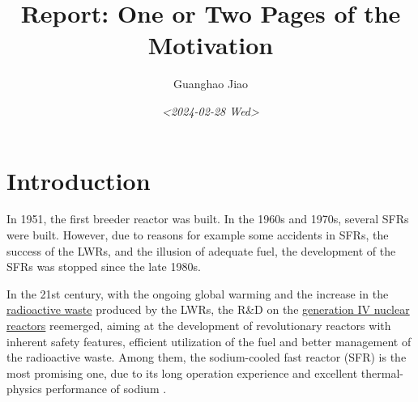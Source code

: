 \documentclass[11pt]{article}
\author{Guanghao Jiao}
\date{\textit{<2024-02-28 Wed>}}
\title{Report: One or Two Pages of the Motivation}
\begin{document}
\maketitle


\section{Introduction}
\label{sec:orge25106c}
In 1951, the first breeder reactor was built. In the 1960s and 1970s, several SFRs were built. However, due to reasons for example some accidents in SFRs, the success of the LWRs, and the illusion of adequate fuel, the development of the SFRs was stopped since the late 1980s.

In the 21st century, with the ongoing global warming and the increase in the \href{20240203204039-radioactive_waste.org}{radioactive waste} produced by the LWRs, the R\&D on the \href{20240131150544-nuclear_reactor_generation_iv.org}{generation IV nuclear reactors} reemerged, aiming at the development of revolutionary reactors with inherent safety features, efficient utilization of the fuel and better management of the radioactive waste. Among them, the sodium-cooled fast reactor (SFR) is the most promising one, due to its long operation experience and excellent thermal-physics performance of sodium \cite{TechnologyRoadmapUpdate}.
\end{document}
